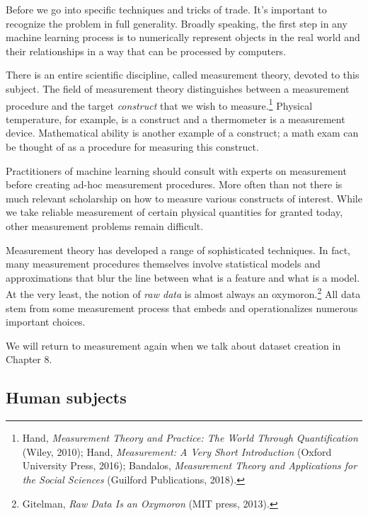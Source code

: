 \documentclass{tufte-book}
\begin{document}

Before we go into specific techniques and tricks of trade. It's
important to recognize the problem in full generality. Broadly speaking,
the first step in any machine learning process is to numerically
represent objects in the real world and their relationships in a way
that can be processed by computers.

There is an entire scientific discipline, called measurement theory,
devoted to this subject. The field of measurement theory distinguishes
between a measurement procedure and the target \emph{construct} that we
wish to measure.\footnote{Hand, \emph{Measurement Theory and Practice:
  The World Through Quantification} (Wiley, 2010); Hand,
  \emph{Measurement: A Very Short Introduction} (Oxford University
  Press, 2016); Bandalos, \emph{Measurement Theory and Applications for
  the Social Sciences} (Guilford Publications, 2018).} Physical
temperature, for example, is a construct and a thermometer is a
measurement device. Mathematical ability is another example of a
construct; a math exam can be thought of as a procedure for measuring
this construct.

Practitioners of machine learning should consult with experts on
measurement before creating ad-hoc measurement procedures. More often
than not there is much relevant scholarship on how to measure various
constructs of interest. While we take reliable measurement of certain
physical quantities for granted today, other measurement problems remain
difficult.

Measurement theory has developed a range of sophisticated techniques. In
fact, many measurement procedures themselves involve statistical models
and approximations that blur the line between what is a feature and what
is a model. At the very least, the notion of \emph{raw data} is almost
always an oxymoron.\footnote{Gitelman, \emph{Raw Data Is an Oxymoron}
  (MIT press, 2013).} All data stem from some measurement process that
embeds and operationalizes numerous important choices.

We will return to measurement again when we talk about dataset creation
in Chapter 8.

\hypertarget{human-subjects}{%
\subsection{Human subjects}\label{human-subjects}}

\end{document}
